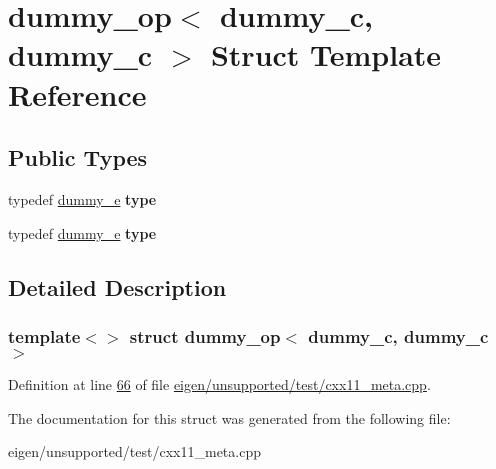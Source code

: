 \hypertarget{structdummy__op_3_01dummy__c_00_01dummy__c_01_4}{}\section{dummy\+\_\+op$<$ dummy\+\_\+c, dummy\+\_\+c $>$ Struct Template Reference}
\label{structdummy__op_3_01dummy__c_00_01dummy__c_01_4}
\subsection*{Public Types}
\begin{DoxyCompactItemize}
\item 
\mbox{\label{structdummy__op_3_01dummy__c_00_01dummy__c_01_4_a2841601b59ec734cfafe3e80c79809a0}} 
typedef \hyperlink{structdummy__e}{dummy\+\_\+e} {\bfseries type}
\item 
\mbox{\label{structdummy__op_3_01dummy__c_00_01dummy__c_01_4_a2841601b59ec734cfafe3e80c79809a0}} 
typedef \hyperlink{structdummy__e}{dummy\+\_\+e} {\bfseries type}
\end{DoxyCompactItemize}


\subsection{Detailed Description}
\subsubsection*{template$<$$>$\newline
struct dummy\+\_\+op$<$ dummy\+\_\+c, dummy\+\_\+c $>$}



Definition at line \hyperlink{eigen_2unsupported_2test_2cxx11__meta_8cpp_source_l00066}{66} of file \hyperlink{eigen_2unsupported_2test_2cxx11__meta_8cpp_source}{eigen/unsupported/test/cxx11\+\_\+meta.\+cpp}.



The documentation for this struct was generated from the following file\+:\begin{DoxyCompactItemize}
\item 
eigen/unsupported/test/cxx11\+\_\+meta.\+cpp\end{DoxyCompactItemize}
